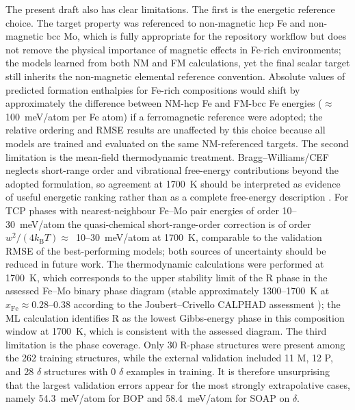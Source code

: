 \documentclass[prb,twocolumn,floatfix]{revtex4-2}
\begin{document}
The present draft also has clear limitations. The first is the energetic reference choice. The target property was referenced to non-magnetic hcp Fe and non-magnetic bcc Mo, which is fully appropriate for the repository workflow but does not remove the physical importance of magnetic effects in Fe-rich environments; the models learned from both NM and FM calculations, yet the final scalar target still inherits the non-magnetic elemental reference convention. Absolute values of predicted formation enthalpies for Fe-rich compositions would shift by approximately the difference between NM-hcp Fe and FM-bcc Fe energies ($\approx$100~meV/atom per Fe atom) if a ferromagnetic reference were adopted; the relative ordering and RMSE results are unaffected by this choice because all models are trained and evaluated on the same NM-referenced targets. The second limitation is the mean-field thermodynamic treatment. Bragg--Williams/CEF neglects short-range order and vibrational free-energy contributions beyond the adopted formulation, so agreement at 1700~K should be interpreted as evidence of useful energetic ranking rather than as a complete free-energy description \cite{Hillert2001CEF,Fries1998BWG,JoubertCrivello2012}. For TCP phases with nearest-neighbour Fe--Mo pair energies of order 10--30~meV/atom the quasi-chemical short-range-order correction is of order $w^2/(4k_{\mathrm{B}}T)\approx$~10--30~meV/atom at 1700~K, comparable to the validation RMSE of the best-performing models; both sources of uncertainty should be reduced in future work. The thermodynamic calculations were performed at 1700~K, which corresponds to the upper stability limit of the R phase in the assessed Fe--Mo binary phase diagram (stable approximately 1300--1700~K at $x_{\mathrm{Fe}}\approx 0.28$--$0.38$ according to the Joubert--Crivello CALPHAD assessment \cite{JoubertCrivello2012}); the ML calculation identifies R as the lowest Gibbs-energy phase in this composition window at 1700~K, which is consistent with the assessed diagram. The third limitation is the phase coverage. Only 30 R-phase structures were present among the 262 training structures, while the external validation included 11 M, 12 P, and 28 $\delta$ structures with 0 $\delta$ examples in training. It is therefore unsurprising that the largest validation errors appear for the most strongly extrapolative cases, namely 54.3~meV/atom for BOP and 58.4~meV/atom for SOAP on $\delta$.
\end{document}
